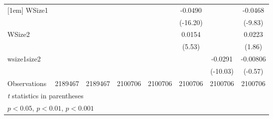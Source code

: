 {\begin{tabular}{l*{7}{c}}
[1em]
WSize1              &                     &                     &                     &                     &     -0.0490\sym{***}&                     &     -0.0468\sym{***}\\
                    &                     &                     &                     &                     &    (-16.20)         &                     &     (-9.83)         \\
[1em]
WSize2              &                     &                     &                     &                     &      0.0154\sym{***}&                     &      0.0223         \\
                    &                     &                     &                     &                     &      (5.53)         &                     &      (1.86)         \\
[1em]
wsize1size2         &                     &                     &                     &                     &                     &     -0.0291\sym{***}&    -0.00806         \\
                    &                     &                     &                     &                     &                     &    (-10.03)         &     (-0.57)         \\
\hline
Observations        &     2189467         &     2189467         &     2100706         &     2100706         &     2100706         &     2100706         &     2100706         \\
\hline\hline
\multicolumn{8}{l}{\footnotesize \textit{t} statistics in parentheses}\\
\multicolumn{8}{l}{\footnotesize \sym{*} \(p<0.05\), \sym{**} \(p<0.01\), \sym{***} \(p<0.001\)}\\
\end{tabular}
}
